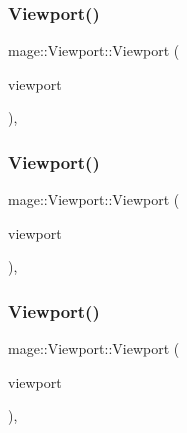 \subsubsection{\texorpdfstring{Viewport()}{Viewport()}\hspace{0.1cm}{\footnotesize\ttfamily [6/9]}}
{\footnotesize\ttfamily mage\+::\+Viewport\+::\+Viewport (\begin{DoxyParamCaption}\item[{D3\+D11\+\_\+\+V\+I\+E\+W\+P\+O\+RT}]{viewport }\end{DoxyParamCaption})\hspace{0.3cm}{\ttfamily [explicit]}, {\ttfamily [noexcept]}}

\hypertarget{classmage_1_1_viewport_a13e2f3281c298ca6dded572ad11330ef}{}\label{classmage_1_1_viewport_a13e2f3281c298ca6dded572ad11330ef} 
\subsubsection{\texorpdfstring{Viewport()}{Viewport()}\hspace{0.1cm}{\footnotesize\ttfamily [7/9]}}
{\footnotesize\ttfamily mage\+::\+Viewport\+::\+Viewport (\begin{DoxyParamCaption}\item[{const \hyperlink{classmage_1_1_viewport}{Viewport} \&}]{viewport }\end{DoxyParamCaption})\hspace{0.3cm}{\ttfamily [default]}, {\ttfamily [noexcept]}}

\hypertarget{classmage_1_1_viewport_a881fcff3291cc87be5cfc6e502ba4a73}{}\label{classmage_1_1_viewport_a881fcff3291cc87be5cfc6e502ba4a73} 
\subsubsection{\texorpdfstring{Viewport()}{Viewport()}\hspace{0.1cm}{\footnotesize\ttfamily [8/9]}}
{\footnotesize\ttfamily mage\+::\+Viewport\+::\+Viewport (\begin{DoxyParamCaption}\item[{\hyperlink{classmage_1_1_viewport}{Viewport} \&\&}]{viewport }\end{DoxyParamCaption})\hspace{0.3cm}{\ttfamily [default]}, {\ttfamily [noexcept]}}

